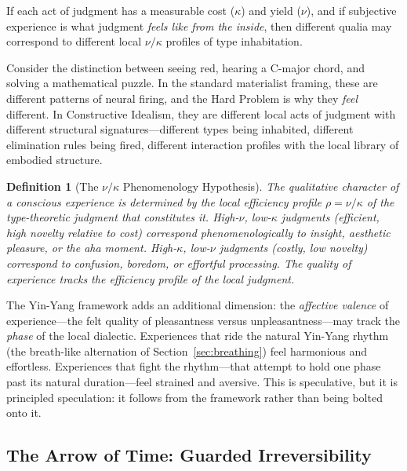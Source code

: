 \documentclass[12pt,a4paper]{article}
\newtheorem{definition}{Definition}[section]
\begin{document}
If each act of judgment has a measurable cost ($\kappa$) and yield ($\nu$), and if subjective experience is what judgment \emph{feels like from the inside}, then different qualia may correspond to different local $\nu/\kappa$ profiles of type inhabitation.

Consider the distinction between seeing red, hearing a C-major chord, and solving a mathematical puzzle. In the standard materialist framing, these are different patterns of neural firing, and the Hard Problem is why they \emph{feel} different. In Constructive Idealism, they are different local acts of judgment with different structural signatures---different types being inhabited, different elimination rules being fired, different interaction profiles with the local library of embodied structure.

\begin{definition}[The $\nu/\kappa$ Phenomenology Hypothesis]
\label{def:phenomenology}
The qualitative character of a conscious experience is determined by the local efficiency profile $\rho = \nu/\kappa$ of the type-theoretic judgment that constitutes it. High-$\nu$, low-$\kappa$ judgments (efficient, high novelty relative to cost) correspond phenomenologically to insight, aesthetic pleasure, or the \emph{aha} moment. High-$\kappa$, low-$\nu$ judgments (costly, low novelty) correspond to confusion, boredom, or effortful processing. The quality of experience tracks the efficiency profile of the local judgment.
\end{definition}

The Yin-Yang framework adds an additional dimension: the \emph{affective valence} of experience---the felt quality of pleasantness versus unpleasantness---may track the \emph{phase} of the local dialectic. Experiences that ride the natural Yin-Yang rhythm (the breath-like alternation of Section~\ref{sec:breathing}) feel harmonious and effortless. Experiences that fight the rhythm---that attempt to hold one phase past its natural duration---feel strained and aversive. This is speculative, but it is principled speculation: it follows from the framework rather than being bolted onto it.


\subsection{The Arrow of Time: Guarded Irreversibility}
\label{sec:arrow}
\end{document}
